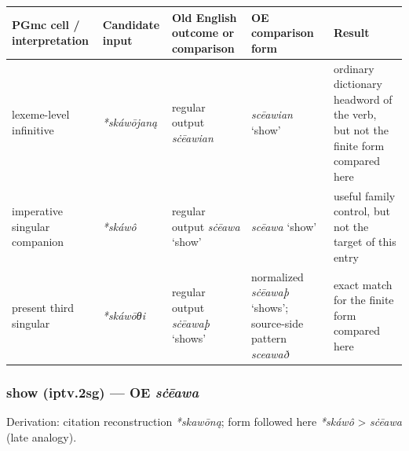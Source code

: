 \documentclass[
  british,
  a4paper,
]{article}
\newcounter{none} %
\begin{document}
{\def\LTcaptype{none} %
\begin{longtable}[]{@{}
  >{\raggedright\arraybackslash}p{}
  >{\raggedright\arraybackslash}p{}
  >{\raggedright\arraybackslash}p{}
  >{\raggedright\arraybackslash}p{}
  >{\raggedright\arraybackslash}p{}@{}}
\toprule\noalign{}
\begin{minipage}[b]{\linewidth}\raggedright
PGmc cell / interpretation
\end{minipage} & \begin{minipage}[b]{\linewidth}\raggedright
Candidate input
\end{minipage} & \begin{minipage}[b]{\linewidth}\raggedright
Old English outcome or comparison
\end{minipage} & \begin{minipage}[b]{\linewidth}\raggedright
OE comparison form
\end{minipage} & \begin{minipage}[b]{\linewidth}\raggedright
Result
\end{minipage} \\
\midrule\noalign{}
\endhead
\bottomrule\noalign{}
\endlastfoot
lexeme-level infinitive & {\emph{*skáwōjaną}} & regular output
{\emph{sċēawian}} & {\emph{scēawian}} `show' & ordinary dictionary
headword of the verb, but not the finite form compared here \\
imperative singular companion & {\emph{*skáwô}} & regular output
{\emph{sċēawa}} `show' & {\emph{scēawa}} `show' & useful family control,
but not the target of this entry \\
present third singular & {\emph{*skáwōθi}} & regular output
{\emph{sċēawaþ}} `shows' & normalized {\emph{sċēawaþ}} `shows';
source-side pattern \emph{sceawað} & exact match for the finite form
compared here \\
\end{longtable}
}

\subsubsection{\texorpdfstring{show (iptv.2sg) --- OE
\emph{sċēawa}}{show (iptv.2sg) --- OE sċēawa}}\label{show-iptv.2sg-oe-sux10bux113awa}

Derivation: citation reconstruction \emph{*skawōną}; form followed here
\emph{*skáwô} \textgreater{} \emph{sċēawa} (late analogy).
\end{document}
